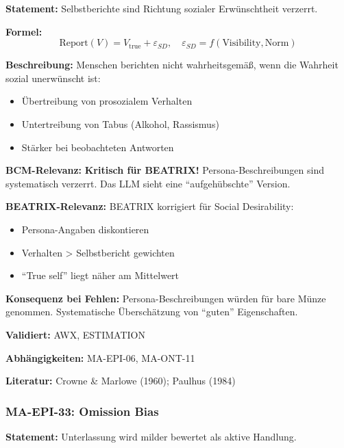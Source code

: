 \textbf{Statement:} Selbstberichte sind Richtung sozialer Erwünschtheit verzerrt.

\textbf{Formel:}
\begin{equation}
\text{Report}(V) = V_{\text{true}} + \varepsilon_{SD}, \quad \varepsilon_{SD} = f(\text{Visibility}, \text{Norm})
\end{equation}

\textbf{Beschreibung:}
Menschen berichten nicht wahrheitsgemäß, wenn die Wahrheit sozial unerwünscht ist:
\begin{itemize}
    \item Übertreibung von prosozialem Verhalten
    \item Untertreibung von Tabus (Alkohol, Rassismus)
    \item Stärker bei beobachteten Antworten
\end{itemize}

\textbf{BCM-Relevanz:}
\textbf{Kritisch für BEATRIX!} Persona-Beschreibungen sind systematisch verzerrt. Das LLM sieht eine ``aufgehübschte'' Version.

\textbf{BEATRIX-Relevanz:}
BEATRIX korrigiert für Social Desirability:
\begin{itemize}
    \item Persona-Angaben diskontieren
    \item Verhalten > Selbstbericht gewichten
    \item ``True self'' liegt näher am Mittelwert
\end{itemize}

\textbf{Konsequenz bei Fehlen:}
Persona-Beschreibungen würden für bare Münze genommen. Systematische Überschätzung von ``guten'' Eigenschaften.

\textbf{Validiert:} AWX, ESTIMATION

\textbf{Abhängigkeiten:} MA-EPI-06, MA-ONT-11

\textbf{Literatur:} Crowne \& Marlowe (1960); Paulhus (1984)


\subsubsection*{MA-EPI-33: Omission Bias}

\textbf{Statement:} Unterlassung wird milder bewertet als aktive Handlung.

